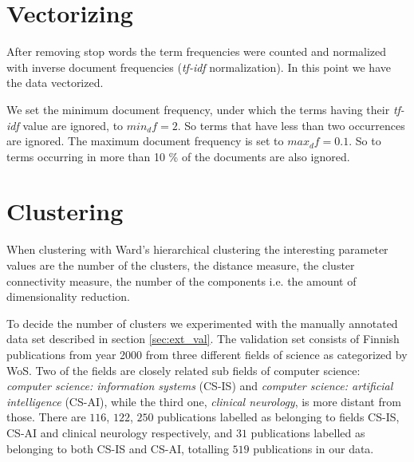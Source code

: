 \section{Vectorizing}
After removing stop words the term frequencies were counted and 
normalized with inverse document frequencies (\emph{tf-idf} 
normalization). 
In this point we have the data vectorized.

We set the minimum document frequency, under which the terms 
having their \emph{tf-idf} value are ignored, to $min_df=2$. So 
terms that have less than two occurrences are ignored. The maximum 
document frequency is set to $max_df=0.1$. So to terms 
occurring in more than 10 \% of the documents are also ignored.



\section{Clustering}
When clustering with Ward's hierarchical clustering the 
interesting parameter values are the number of the clusters, 
the distance measure, the cluster connectivity measure, the 
number of the components i.e. the amount of dimensionality 
reduction. 

To decide the number of clusters we experimented with the manually 
annotated data set described in section \ref{sec:ext_val}.
The validation set consists of Finnish publications from year 2000
from three different fields of science as categorized by WoS.
Two of the fields are closely related sub fields of computer
science: \emph{computer science: information systems} (CS-IS) and 
\emph{computer science: 
artificial intelligence} (CS-AI), while the third one, 
\emph{clinical neurology}, is more distant from those. There are 
$116$, $122$, $250$ publications labelled as belonging to fields 
CS-IS, CS-AI and clinical neurology respectively, and $31$ 
publications labelled as belonging to both CS-IS and CS-AI, 
totalling $519$ publications in our data.

